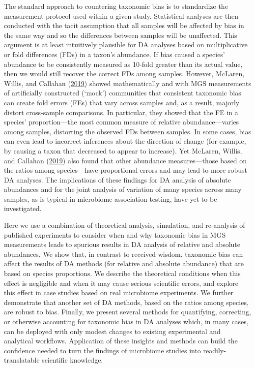 \documentclass[
]{article}
\begin{document}
The standard approach to countering taxonomic bias is to standardize the measurement protocol used within a given study.
Statistical analyses are then conducted with the tacit assumption that all samples will be affected by bias in the same way and so the differences between samples will be unaffected.
This argument is at least intuitively plausible for DA analyses based on multiplicative or fold differences (FDs) in a taxon's abundance.
If bias caused a species' abundance to be consistently measured as 10-fold greater than its actual value, then we would still recover the correct FDs among samples.
However, McLaren, Willis, and Callahan (\protect\hyperlink{ref-mclaren2019cons}{2019}) showed mathematically and with MGS measurements of artificially constructed (`mock') communities that consistent taxonomic bias can create fold errors (FEs) that vary across samples and, as a result, majorly distort cross-sample comparisons.
In particular, they showed that the FE in a species' proportion---the most common measure of relative abundance---varies among samples, distorting the observed FDs between samples.
In some cases, bias can even lead to incorrect inferences about the direction of change (for example, by causing a taxon that decreased to appear to increase).
Yet McLaren, Willis, and Callahan (\protect\hyperlink{ref-mclaren2019cons}{2019}) also found that other abundance measures---those based on the ratios among species---have proportional errors and may lead to more robust DA analyses.
The implications of these findings for DA analysis of absolute abundances and for the joint analysis of variation of many species across many samples, as is typical in microbiome association testing, have yet to be investigated.

Here we use a combination of theoretical analysis, simulation, and re-analysis of published experiments to consider when and why taxonomic bias in MGS measurements leads to spurious results in DA analysis of relative and absolute abundances.
We show that, in contrast to received wisdom, taxonomic bias can affect the results of DA methods (for relative and absolute abundance) that are based on species proportions.
We describe the theoretical conditions when this effect is negligible and when it may cause serious scientific errors, and explore this effect in case studies based on real microbiome experiments.
We further demonstrate that another set of DA methods, based on the ratios among species, are robust to bias.
Finally, we present several methods for quantifying, correcting, or otherwise accounting for taxonomic bias in DA analyses which, in many cases, can be deployed with only modest changes to existing experimental and analytical workflows.
Application of these insights and methods can build the confidence needed to turn the findings of microbiome studies into readily-translatable scientific knowledge.
\end{document}
